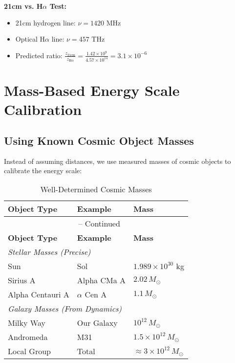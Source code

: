 \documentclass[12pt,a4paper]{article}
\theoremstyle{definition}
\begin{document}
	\begin{experiment}
		\textbf{21cm vs. H$\alpha$ Test:}
		\begin{itemize}
			\item 21cm hydrogen line: $\nu = 1420$ MHz
			\item Optical H$\alpha$ line: $\nu = 457$ THz
			\item Predicted ratio: $\frac{z_{21\text{cm}}}{z_{\text{H}\alpha}} = \frac{1.42 \times 10^9}{4.57 \times 10^{14}} = 3.1 \times 10^{-6}$
		\end{itemize}
	\end{experiment}
	
	\section{Mass-Based Energy Scale Calibration}
	
	\subsection{Using Known Cosmic Object Masses}
	
	Instead of assuming distances, we use measured masses of cosmic objects to calibrate the energy scale:
	
	\begin{longtable}{lll}
		\caption{Well-Determined Cosmic Masses} \\
		\toprule
		\textbf{Object Type} & \textbf{Example} & \textbf{Mass} \\
		\midrule
		\endfirsthead
		\multicolumn{3}{c}{\tablename\ \thetable{} -- Continued} \\
		\toprule
		\textbf{Object Type} & \textbf{Example} & \textbf{Mass} \\
		\midrule
		\endhead
		\multicolumn{3}{l}{\emph{Stellar Masses (Precise)}} \\
		Sun & Sol & $1.989 \times 10^{30}$ kg \\
		Sirius A & Alpha CMa A & $2.02\,M_\odot$ \\
		Alpha Centauri A & $\alpha$ Cen A & $1.1\,M_\odot$ \\
		\midrule
		\multicolumn{3}{l}{\emph{Galaxy Masses (From Dynamics)}} \\
		Milky Way & Our Galaxy & $10^{12}\,M_\odot$ \\
		Andromeda & M31 & $1.5 \times 10^{12}\,M_\odot$ \\
		Local Group & Total & $\approx 3 \times 10^{12}\,M_\odot$ \\
		\bottomrule
	\end{longtable}
	
\end{document}
